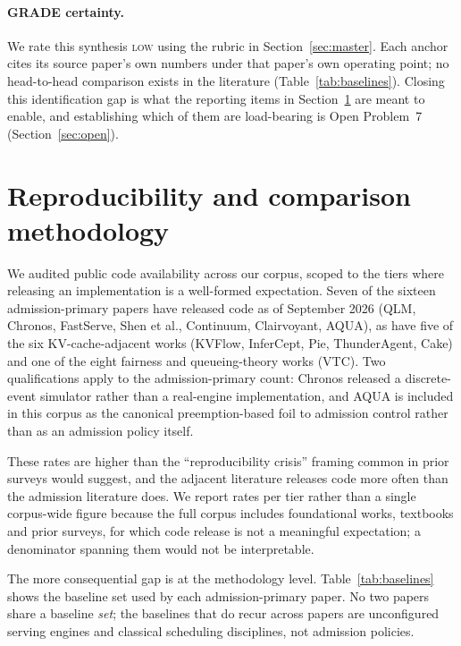 \documentclass[11pt,letterpaper]{article}
\theoremstyle{definition}
\begin{document}
\paragraph{GRADE certainty.} We rate this synthesis \textsc{low}
using the rubric in Section~\ref{sec:master}. Each anchor cites its
source paper's own numbers under that paper's own operating point;
no head-to-head comparison exists in the literature
(Table~\ref{tab:baselines}). Closing this identification gap is what
the reporting items in Section~\ref{sec:repro} are meant to enable, and
establishing which of them are load-bearing is Open Problem~7
(Section~\ref{sec:open}).

\section{Reproducibility and comparison methodology}
\label{sec:repro}

We audited public code availability across our corpus, scoped to the
tiers where releasing an implementation is a well-formed expectation.
Seven of the sixteen admission-primary papers have released code as of
September 2026 (QLM, Chronos, FastServe, Shen et al., Continuum,
Clairvoyant, AQUA), as have five of the six KV-cache-adjacent works
(KVFlow, InferCept, Pie, ThunderAgent, Cake) and one of the eight
fairness and queueing-theory works (VTC). Two qualifications apply to
the admission-primary count: Chronos released a discrete-event
simulator rather than a real-engine implementation, and AQUA is
included in this corpus as the canonical preemption-based foil to
admission control rather than as an admission policy itself.

These rates are higher than the ``reproducibility crisis'' framing
common in prior surveys would suggest, and the adjacent literature
releases code more often than the admission literature does. We report
rates per tier rather than a single corpus-wide figure because the full
corpus includes foundational works, textbooks and prior surveys, for
which code release is not a meaningful expectation; a denominator
spanning them would not be interpretable.

The more consequential gap is at the methodology level.
Table~\ref{tab:baselines} shows the baseline set used by each
admission-primary paper. No two papers share a baseline \emph{set}; the
baselines that do recur across papers are unconfigured serving engines
and classical scheduling disciplines, not admission policies.
\end{document}
